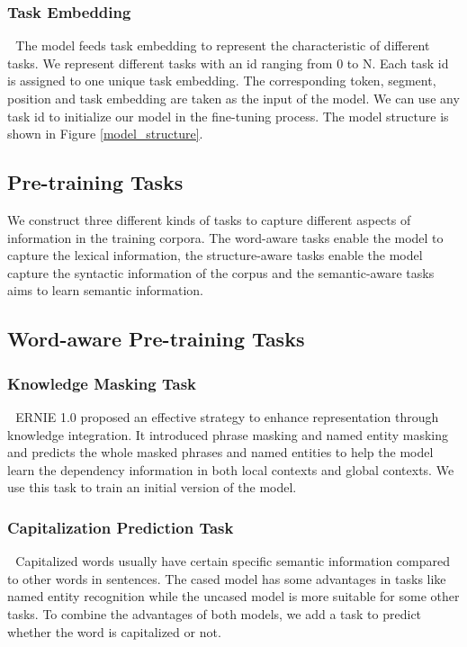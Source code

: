 \documentclass[letterpaper]{article} \usepackage{aaai20}  \usepackage{times}  \usepackage{helvet} \usepackage{courier}  \usepackage[hyphens]{url}  \usepackage{graphicx} \usepackage{makecell}
\begin{document}
\subsubsection{Task Embedding} \,\,
The model feeds task embedding to represent the characteristic of different tasks. We represent different tasks with an id ranging from 0 to N. Each task id is assigned to one unique task embedding. The corresponding token, segment, position and task embedding are taken as the input of the model. We can use any task id to initialize our model in the fine-tuning process. The model structure is shown in Figure \ref{model_structure}.

\subsection{Pre-training Tasks}
We construct three different kinds of tasks to capture different aspects of information in the training corpora.
The word-aware tasks enable the model to capture the lexical information, the structure-aware tasks enable the model capture the syntactic information of the corpus and the semantic-aware tasks aims to learn semantic information. 

\subsection{Word-aware Pre-training Tasks}

\subsubsection{Knowledge Masking Task} \,\, 
ERNIE 1.0\cite{sun2019ernie} proposed an effective strategy to enhance representation through knowledge integration. It introduced phrase masking and named entity masking and predicts the whole masked phrases and named entities to help the model learn the dependency information in both local contexts and global contexts. We use this task to train an initial version of the model.


\subsubsection{Capitalization Prediction Task} \,\, 
Capitalized words usually have certain specific semantic information compared to other words in sentences. The cased model has some advantages in tasks like named entity recognition while the uncased model is more suitable for some other tasks. To combine the advantages of both models, we add a task to predict whether the word is capitalized or not. 
\end{document}
